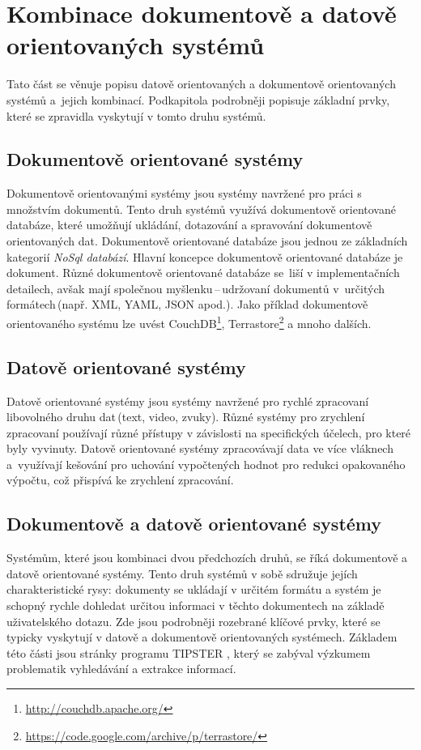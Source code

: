 \section{Kombinace dokumentově a datově orientovaných systémů}
Tato část se věnuje popisu datově orientovaných a dokumentově orientovaných systémů a~jejich kombinací. Podkapitola podrobněji popisuje základní prvky, které se zpravidla vyskytují v tomto druhu systémů.


\subsection{Dokumentově orientované systémy}
Dokumentově orientovanými systémy jsou systémy navržené pro práci s množstvím dokumentů.  Tento druh systémů využívá dokumentově orientované databáze, které umožňují ukládání, dotazování a spravování dokumentově orientovaných dat. Dokumentově orientované databáze jsou jednou ze základních kategorií \emph{NoSql databází}.  Hlavní koncepce dokumentově orientované databáze je dokument. Různé dokumentově orientované databáze se~liší v implementačních detailech, avšak mají společnou myšlenku\,--\,udržovaní dokumentů v~určitých formátech\,(např. XML, YAML, JSON apod.). Jako příklad dokumentově orientovaného systému lze uvést CouchDB\footnote{\href{http://couchdb.apache.org/}{http://couchdb.apache.org/}}, Terrastore\footnote{\href{https://code.google.com/archive/p/terrastore/}{https://code.google.com/archive/p/terrastore/}} a mnoho dalších.
 
 \subsection{Datově orientované systémy}
 Datově orientované systémy jsou systémy navržené pro rychlé zpracovaní libovolného druhu dat\,(text, video, zvuky). Různé systémy pro zrychlení zpracovaní používají různé přístupy v závislosti na specifických účelech, pro které byly vyvinuty. Datově orientované systémy zpracovávají data ve více vláknech a~využívají kešování pro uchování vypočtených hodnot pro redukci opakovaného výpočtu, což přispívá ke zrychlení zpracování. 

\subsection{Dokumentově a datově orientované systémy}
Systémům, které jsou kombinaci dvou předchozích druhů, se říká dokumentově a datově orientované systémy. Tento druh systémů v sobě sdružuje jejích charakteristické rysy: dokumenty se ukládají v určitém formátu a systém je schopný rychle dohledat určitou informaci v těchto dokumentech na základě uživatelského dotazu. Zde jsou podrobněji rozebrané klíčové prvky, které se typicky vyskytují v  datově a dokumentově orientovaných systémech. Základem této části jsou stránky programu TIPSTER \cite{TIPSTER}, který se zabýval výzkumem problematik vyhledávání a extrakce informací. 



